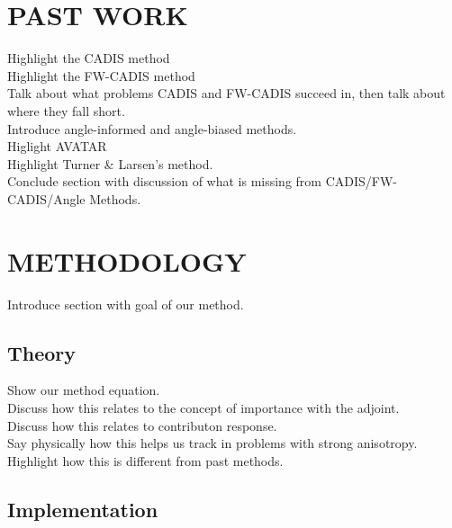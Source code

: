 \documentclass[12pt]{article}
\begin{document}
\section{PAST WORK}
\label{sec::past}
Highlight the CADIS method \\
Highlight the FW-CADIS method \\
Talk about what problems CADIS and FW-CADIS succeed in, then talk about where they fall short. \\
Introduce angle-informed and angle-biased methods. \\
Higlight AVATAR \\
Highlight Turner \& Larsen's method. \\
Conclude section with discussion of what is missing from CADIS/FW-CADIS/Angle Methods. \\

%
\section{METHODOLOGY}
\label{sect::second}

Introduce section with goal of our method. \\

%
\subsection{Theory}
\label{subsect::major}

Show our method equation. \\
Discuss how this relates to the concept of importance with the adjoint. \\
Discuss how this relates to contributon response. \\
Say physically how this helps us track in problems with strong anisotropy. \\
Highlight how this is different from past methods.

%

\subsection{Implementation}
\label{subsect::major}
\end{document}

